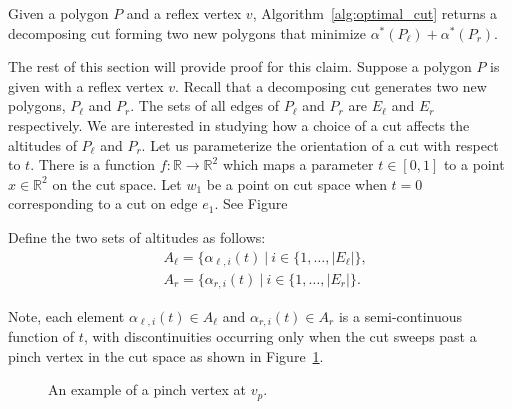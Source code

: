 \documentclass[../main.tex]{subfiles}
\begin{document}
\begin{claim}
Given a polygon $P$ and a reflex vertex $v$, Algorithm~\ref{alg:optimal_cut} returns a decomposing cut forming two new polygons that minimize $\alpha^*(P_{\ell})+\alpha^*(P_r)$.
\end{claim}

The rest of this section will provide proof for this claim. Suppose a polygon $P$ is given with a reflex vertex $v$. Recall that a decomposing cut generates two new polygons, $P_{\ell}$ and $P_r$. The sets of all edges of $P_{\ell}$ and $P_r$ are $E_{\ell}$ and $E_r$ respectively. We are interested in studying how a choice of a cut affects the altitudes of $P_{\ell}$ and $P_r$. Let us parameterize the orientation of a cut with respect to $t$. There is a function $f:\mathbb{R}\to\mathbb{R}^2$ which maps a parameter $t\in[0,1]$ to a point $x\in\mathbb{R}^2$ on the cut space. Let $w_1$ be a point on cut space when $t=0$ corresponding to a cut on edge $e_1$. See Figure~%

Define the two sets of altitudes as follows:
\begin{equation}
\begin{aligned}
\label{eq:set_of_altitudes}
&A_{\ell}=\{\alpha_{\ell,i}(t)\ |\ i\in\{1,\ldots,|E_{\ell}|\},\\
&A_{r}=\{\alpha_{r,i}(t)\ |\ i\in\{1,\ldots,|E_r|\}.
\end{aligned}
\end{equation}


Note, each element $\alpha_{\ell,i}(t)\in A_{\ell}$ and $\alpha_{r,i}(t)\in A_r$ is a semi-continuous function of $t$, with discontinuities occurring only when the cut sweeps past a pinch vertex in the cut space as shown in Figure~\ref{fig:pinch_vertex}.

\begin{figure}
	\centering
	
	\caption{An example of a pinch vertex at $v_p$.}
	\label{fig:pinch_vertex}
\end{figure}
\end{document}

